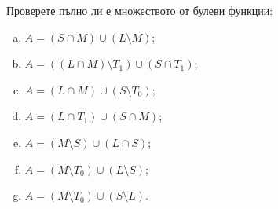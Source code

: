 \begin{problem} %
  Проверете пълно ли е множеството от булеви функции:
  \begin{enumerate}[a)]
  \item
    $A = (S\cap M)\cup(L\setminus M)$;
  \item
    $A = ((L\cap M)\setminus T_1)\cup (S\cap T_1)$;
  \item
    $A = (L\cap M)\cup (S\setminus T_0)$;
  \item
    $A = (L\cap T_1)\cup (S\cap M)$;
  \item
    $A = (M\setminus S)\cup(L\cap S)$;
  \item
    $A = (M\setminus T_0)\cup (L\setminus S)$;
  \item
    $A = (M\setminus T_0) \cup (S\setminus L)$.
  \end{enumerate}
\end{problem}
